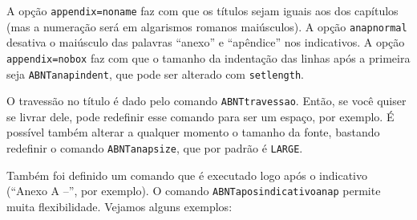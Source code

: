 \documentclass[espaco=simples,appendix=Name]{abnt}
\newcommand{\bs}{\symbol{92}}   %
\begin{document}


A opção \texttt{appendix=noname} faz com que os títulos sejam iguais aos dos
capítulos (mas a numeração será em algarismos romanos maiúsculos). A opção
\texttt{anapnormal} desativa o maiúsculo das palavras ``anexo'' e
``apêndice'' nos indicativos. A opção \texttt{appendix=nobox} faz com que
o tamanho da indentação das linhas após a primeira seja
\texttt{\bs ABNTanapindent}, que pode ser alterado com
\texttt{\bs setlength}.

O travessão no título é dado pelo comando \texttt{\bs ABNTtravessao}.
Então, se você quiser se livrar dele, pode redefinir esse comando para ser
um espaço, por exemplo. É possível também alterar a qualquer momento o
tamanho da fonte, bastando redefinir o comando \texttt{\bs ABNTanapsize},
que por padrão é \texttt{\bs LARGE}.

Também foi definido um comando que é executado logo após o indicativo
(``Anexo A --'', por exemplo). O comando \texttt{\bs ABNTaposindicativoanap}
permite muita flexibilidade. Vejamos alguns exemplos:
\end{document}
